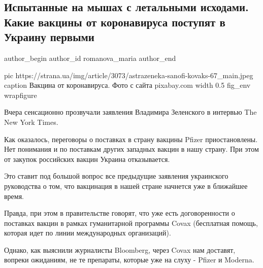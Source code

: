 
 
 
 
 
 
\subsection{Испытанные на мышах с летальными исходами. Какие вакцины от коронавируса поступят в Украину первыми}
\label{sec:21_12_2020.news.ua.strana.romanova_maria.1.myshi_vaccines_covid}
\ifcmt
	author_begin
   author_id romanova_maria
	author_end
\fi

\ifcmt
  pic https://strana.ua/img/article/3073/astrazeneka-sanofi-kovaks-67_main.jpeg
  caption Вакцина от коронавируса. Фото с сайта pixabay.com 
  width 0.5
  fig_env wrapfigure
\fi

Вчера сенсационно прозвучали заявления Владимира Зеленского в интервью The New
York Times.

Как оказалось, переговоры о поставках в страну вакцины Pfizer приостановлены.
Нет понимания и по поставкам других западных вакцин в нашу страну. При этом от
закупок российских вакцин Украина отказывается.

Это ставит под большой вопрос все предыдущие заявления украинского руководства
о том, что вакцинация в нашей стране начнется уже в ближайшее время.

Правда, при этом в правительстве говорят, что уже есть договоренности о
поставках вакцин в рамках гуманитарной программы Covax (бесплатная помощь,
которая идет по линии международных организаций).

Однако, как выяснили журналисты Bloomberg, через Covax нам доставят, вопреки
ожиданиям, не те препараты, которые уже на слуху - Pfizer и Moderna. 

